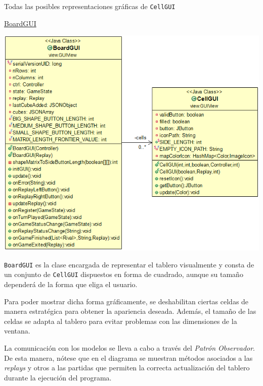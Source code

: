 \documentclass[12pt,a4paper,openright]{book}
\theoremstyle{break}
\begin{document}
\begin{center}
Todas las posibles representaciones gráficas de \texttt{CellGUI}
\end{center}

\newpage

\underline{BoardGUI}
\begin{center}
\includegraphics[scale=0.55]{boardgui-cellgui.png}
\end{center}

\texttt{BoardGUI} es la clase encargada de representar el tablero visualmente y consta de un conjunto de \texttt{CellGUI} dispuestos en forma de cuadrado, aunque su tamaño dependerá de la forma que eliga el usuario.

Para poder mostrar dicha forma gráficamente, se deshabilitan ciertas celdas de manera estratégica para obtener la apariencia deseada. Además, el tamaño de las celdas se adapta al tablero para evitar problemas con las dimensiones de la ventana.

La comunicación con los modelos se lleva a cabo a través del \textit{Patrón Observador}. De esta manera, nótese que en el diagrama se muestran métodos asociados a las \textit{replays} y otros a las partidas que permiten la correcta actualización del tablero durante la ejecución del programa.
\end{document}

